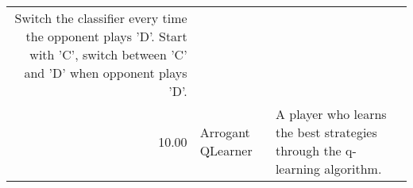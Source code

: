 \begin{tabular}{rll}
	Switch the classifier every time the opponent plays 'D'.
	Start with 'C', switch between 'C' and 'D' when opponent plays 'D'.                                                                                                                                                                                                                                                                                                                                                                                                                                                                                                                                                                                                                                                                                                                                                                                                                               \\
	10.00  & Arrogant QLearner           & A player who learns the best strategies through the q-learning algorithm.


\end{tabular}
